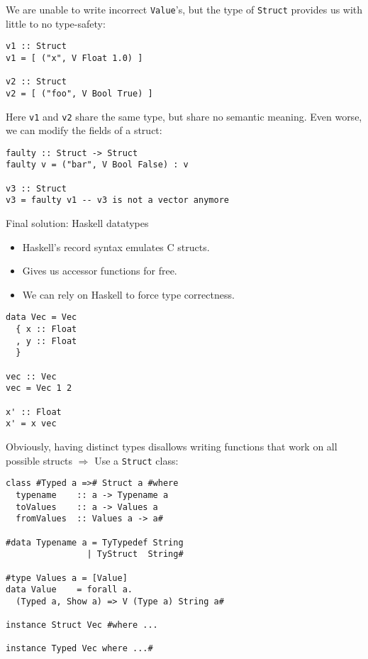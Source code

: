 \documentclass{beamer}
\begin{document}
\begin{frame}[fragile]
  We are unable to write incorrect \texttt{Value}'s, but the type of
  \texttt{Struct} provides us with little to no type-safety:

\begin{lstlisting}
v1 :: Struct
v1 = [ ("x", V Float 1.0) ]

v2 :: Struct
v2 = [ ("foo", V Bool True) ]
\end{lstlisting}
Here \texttt{v1} and \texttt{v2} share the same type, but share no semantic
meaning. Even worse, we can modify the fields of a struct:
\begin{lstlisting}
faulty :: Struct -> Struct
faulty v = ("bar", V Bool False) : v

v3 :: Struct
v3 = faulty v1 -- v3 is not a vector anymore
\end{lstlisting}
\end{frame}



\begin{frame}[fragile]{Final solution: Haskell datatypes}
  \begin{itemize}
    \item Haskell's record syntax emulates C structs.
    \item Gives us accessor functions for free.
    \item We can rely on Haskell to force type correctness.
  \end{itemize}
\begin{lstlisting}
data Vec = Vec
  { x :: Float
  , y :: Float
  }

vec :: Vec
vec = Vec 1 2

x' :: Float
x' = x vec
\end{lstlisting}
\end{frame}

\begin{frame}[fragile]
  Obviously, having distinct types disallows writing functions that work on all
  possible structs $\Rightarrow$ Use a \texttt{Struct} class:

\begin{lstlisting}
class #Typed a =># Struct a #where
  typename    :: a -> Typename a
  toValues    :: a -> Values a
  fromValues  :: Values a -> a#

#data Typename a = TyTypedef String
                | TyStruct  String#

#type Values a = [Value]
data Value    = forall a.
  (Typed a, Show a) => V (Type a) String a#

instance Struct Vec #where ...

instance Typed Vec where ...#
\end{lstlisting}
\end{frame}
\end{document}
